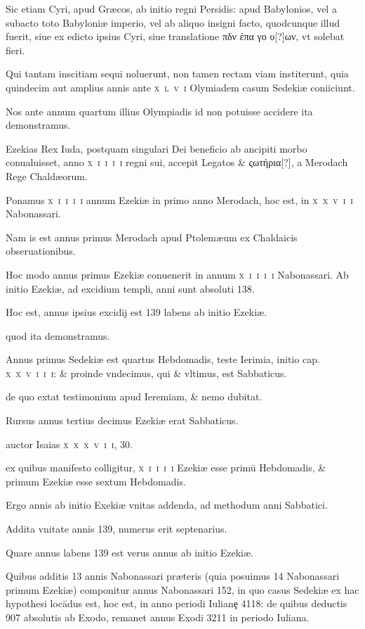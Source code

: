 \begin{parnumbers}
Sic etiam Cyri, apud Græcos, ab initio regni Persidis: apud Babylonios, vel a subacto toto Babyloniæ imperio, vel ab aliquo insigni facto, quodcunque illud fuerit, siue ex edicto ipsius Cyri, siue translatione \textgreek{πδν ἐπα γο υ[?]ων}, vt solebat fieri.

Qui tantam inscitiam sequi noluerunt, non tamen rectam viam institerunt, quia quindecim aut amplius annis ante \textsc{x~l~v~i} Olymiadem casum Sedekiæ coniiciunt.

Nos ante annum quartum illius Olympiadis id non potuisse accidere ita demonstramus. 

Ezekias Rex Iuda, postquam singulari Dei beneficio ab ancipiti morbo conualuisset, anno \textsc{x~i~i~i~i} regni sui, accepit Legatos \& \textgreek{ςωτήρια[?]}, a Merodach Rege Chaldæorum.

Ponamus \textsc{x~i~i~i~i} annum Ezekiæ in primo anno Merodach, hoc est, in \textsc{x~x~v~i~i} Nabonassari.

Nam is est annus primus Merodach apud Ptolemæum ex Chaldaicis obseruationibus. 

Hoc modo annus primus Ezekiæ conuenerit in annum \textsc{x~i~i~i~i} Nabonassari. Ab initio Ezekiæ, ad excidium templi, anni sunt absoluti 138.

Hoc est, annus ipsius excidij est 139 labens ab initio Ezekiæ.

quod ita demonstramus. 

Annus primus Sedekiæ est quartus Hebdomadis, teste Ierimia, initio cap. \textsc{x~x~v~i~i~i}: \& proinde vndecimus, qui \& vltimus, est Sabbaticus. 

de quo extat testimonium apud Ieremiam, \& nemo dubitat.

Rursus annus tertius decimus Ezekiæ erat Sabbaticus. 

auctor Isaias \textsc{x~x~x~v~i~i}, 30.

ex quibus manifesto colligitur, \textsc{x~i~i~i~i} Ezekiæ esse primū Hebdomadis, \& primum Ezekiæ esse sextum Hebdomadis. 

Ergo annis ab initio Exekiæ vnitas addenda, ad methodum anni Sabbatici.

Addita vnitate annis 139, numerus erit septenarius. 

Quare annus labens 139 est verus annus ab initio Ezekiæ.

Quibus additis 13 annis Nabonassari præteris (quia posuimus 14 Nabonassari primum Ezekiæ) componitur annus Nabonassari 152, in quo casus Sedekiæ ex hac hypothesi locādus est, hoc est, in anno periodi Iulianȩ 4118: de quibus deductis 907 absolutis ab Exodo, remanet annus Exodi 3211 in periodo Iuliana.


\end{parnumbers}
